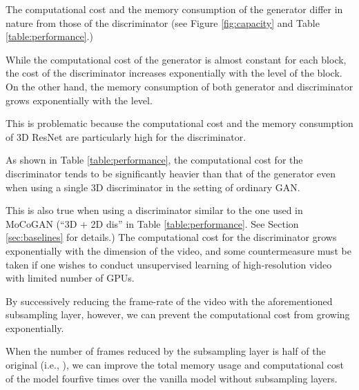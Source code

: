 \documentclass[twocolumn]{svjour3}
\def\Fig#1{Figure \ref{fig:#1}}
\def\Table#1{Table \ref{table:#1}}
\def\Sec#1{Section \ref{sec:#1}}
\begin{document}
The computational cost and the memory consumption of the generator differ in nature from those of the discriminator (see \Fig{capacity} and \Table{performance}.)














While the computational cost of the generator is
almost constant for each block, the cost of the discriminator
increases exponentially with the level of the block.
On the other hand, the memory consumption of both generator and discriminator grows exponentially with the level.


This is problematic because the computational cost and the memory consumption of 3D ResNet are particularly high for the discriminator.








As shown in \Table{performance}, the computational cost for the discriminator tends to be significantly heavier than that of the generator
even when using a single 3D discriminator in the setting of ordinary GAN.



This is also true when using a discriminator similar to the one used in MoCoGAN
(``3D + 2D dis'' in \Table{performance}. See \Sec{baselines} for details.)
The computational cost for the discriminator grows exponentially with the dimension of the video,
and some countermeasure must be taken if one wishes to conduct unsupervised learning of high-resolution video with limited number of GPUs.
















By successively reducing the frame-rate of the video with the aforementioned subsampling layer,
however, we can prevent the computational cost from growing exponentially.




When the number of frames reduced by the subsampling layer is
half of the original (i.e., ), we can improve the total memory usage
and computational cost of the model fourfive times over the vanilla model without subsampling layers.
\end{document}
